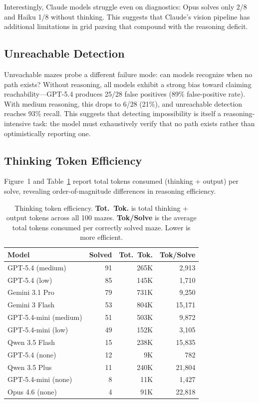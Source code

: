 \documentclass[11pt]{article}
\begin{document}
Interestingly, Claude models struggle even on diagnostics: Opus solves only 2/8 and Haiku 1/8 without thinking.
This suggests that Claude's vision pipeline has additional limitations in grid parsing that compound with the reasoning deficit.

\subsection{Unreachable Detection}

Unreachable mazes probe a different failure mode: can models recognize when no path exists?
Without reasoning, all models exhibit a strong bias toward claiming reachability---GPT-5.4 produces 25/28 false positives (89\% false-positive rate).
With medium reasoning, this drops to 6/28 (21\%), and unreachable detection reaches 93\% recall.
This suggests that detecting impossibility is itself a reasoning-intensive task: the model must exhaustively verify that no path exists rather than optimistically reporting one.

\subsection{Thinking Token Efficiency}
\label{sec:efficiency}

Figure~1 and Table~\ref{tab:efficiency} report total tokens consumed (thinking + output) per solve, revealing order-of-magnitude differences in reasoning efficiency.

\begin{table}[t]
\centering
\small
\begin{tabular}{@{}lrrr@{}}
\toprule
\textbf{Model} & \textbf{Solved} & \textbf{Tot.~Tok.} & \textbf{Tok/Solve} \\
\midrule
GPT-5.4 (medium) & 91 & 265K & 2,913 \\
GPT-5.4 (low) & 85 & 145K & 1,710 \\
Gemini 3.1 Pro & 79 & 731K & 9,250 \\
Gemini 3 Flash & 53 & 804K & 15,171 \\
GPT-5.4-mini (medium) & 51 & 503K & 9,872 \\
GPT-5.4-mini (low) & 49 & 152K & 3,105 \\
Qwen 3.5 Flash & 15 & 238K & 15,835 \\
GPT-5.4 (none) & 12 & 9K & 782 \\
Qwen 3.5 Plus & 11 & 240K & 21,804 \\
GPT-5.4-mini (none) & 8 & 11K & 1,427 \\
Opus 4.6 (none) & 4 & 91K & 22,818 \\
\bottomrule
\end{tabular}
\caption{Thinking token efficiency. \textbf{Tot.~Tok.} is total thinking + output tokens across all 100 mazes. \textbf{Tok/Solve} is the average total tokens consumed per correctly solved maze. Lower is more efficient.}
\label{tab:efficiency}
\end{table}
\end{document}
